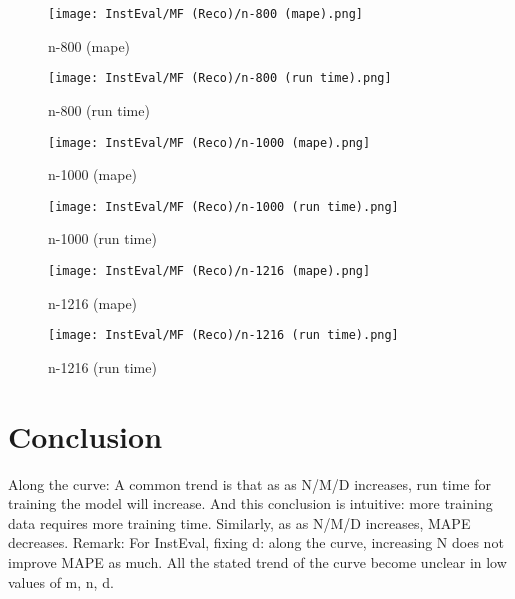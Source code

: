 \documentclass[12pt]{article}
\begin{document}
\begin{figure}[H]
\centering
    \begin{minipage}{0.45\textwidth}
        \centering
        \texttt{[image: InstEval/MF (Reco)/n-800 (mape).png]}
        \caption{n-800 (mape)}
        \label{fig:figure1}
    \end{minipage}\hfill
    \begin{minipage}{0.45\textwidth}
        \centering
        \texttt{[image: InstEval/MF (Reco)/n-800 (run time).png]}
        \caption{n-800 (run time)}
    \end{minipage}
\end{figure}

\begin{figure}[H]
\centering
    \begin{minipage}{0.45\textwidth}
        \centering
        \texttt{[image: InstEval/MF (Reco)/n-1000 (mape).png]}
        \caption{n-1000 (mape)}
        \label{fig:figure1}
    \end{minipage}\hfill
    \begin{minipage}{0.45\textwidth}
        \centering
        \texttt{[image: InstEval/MF (Reco)/n-1000 (run time).png]}
        \caption{n-1000 (run time)}
    \end{minipage}
\end{figure}

\begin{figure}[H]
\centering
    \begin{minipage}{0.45\textwidth}
        \centering
        \texttt{[image: InstEval/MF (Reco)/n-1216 (mape).png]}
        \caption{n-1216 (mape)}
        \label{fig:figure1}
    \end{minipage}\hfill
    \begin{minipage}{0.45\textwidth}
        \centering
        \texttt{[image: InstEval/MF (Reco)/n-1216 (run time).png]}
        \caption{n-1216 (run time)}
    \end{minipage}
\end{figure}



\newpage
\section{Conclusion}
Along the curve: A common trend is that as as N/M/D increases, run time for training the model will increase. And this conclusion is intuitive: more training data requires more training time. \newline 
Similarly, as as N/M/D increases, MAPE decreases. \newline
Remark: For InstEval, fixing d: along the curve, increasing N does not improve MAPE as much. \newline
All the stated trend of the curve become unclear in low values of m, n, d.
\end{document}
